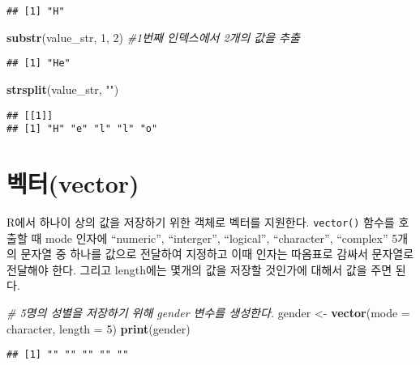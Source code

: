 \documentclass[
]{article}
\newenvironment{Shaded}{\begin{snugshade}}{\end{snugshade}}
\newcommand{\AttributeTok}[1]{\textcolor[rgb]{0.13,0.29,0.53}{#1}}
\newcommand{\CommentTok}[1]{\textcolor[rgb]{0.56,0.35,0.01}{\textit{#1}}}
\newcommand{\DecValTok}[1]{\textcolor[rgb]{0.00,0.00,0.81}{#1}}
\newcommand{\FunctionTok}[1]{\textcolor[rgb]{0.13,0.29,0.53}{\textbf{#1}}}
\newcommand{\NormalTok}[1]{#1}
\newcommand{\OtherTok}[1]{\textcolor[rgb]{0.56,0.35,0.01}{#1}}
\newcommand{\StringTok}[1]{\textcolor[rgb]{0.31,0.60,0.02}{#1}}
\begin{document}
\begin{verbatim}
## [1] "H"
\end{verbatim}

\begin{Shaded}
\begin{Highlighting}[]
\FunctionTok{substr}\NormalTok{(value\_str, }\DecValTok{1}\NormalTok{, }\DecValTok{2}\NormalTok{) }\CommentTok{\#1번째 인덱스에서 2개의 값을 추출}
\end{Highlighting}
\end{Shaded}

\begin{verbatim}
## [1] "He"
\end{verbatim}

\begin{Shaded}
\begin{Highlighting}[]
\FunctionTok{strsplit}\NormalTok{(value\_str, }\StringTok{""}\NormalTok{)}
\end{Highlighting}
\end{Shaded}

\begin{verbatim}
## [[1]]
## [1] "H" "e" "l" "l" "o"
\end{verbatim}

\hypertarget{uxbca1uxd130vector}{%
\section{벡터(vector)}\label{uxbca1uxd130vector}}

R에서 하나이 상의 값을 저장하기 위한 객체로 벡터를 지원한다.
\texttt{vector()} 함수를 호출할 때 mode 인자에 ``numeric'',
``interger'', ``logical'', ``character'', ``complex'' 5개의 문자열 중
하나를 값으로 전달하여 지정하고 이때 인자는 따옴표로 감싸서 문자열로
전달해야 한다. 그리고 length에는 몇개의 값을 저장할 것인가에 대해서 값을
주면 된다.

\begin{Shaded}
\begin{Highlighting}[]
\CommentTok{\# 5명의 성별을 저장하기 위해 gender 변수를 생성한다. }
\NormalTok{gender }\OtherTok{\textless{}{-}} \FunctionTok{vector}\NormalTok{(}\AttributeTok{mode =} \StringTok{\textquotesingle{}character\textquotesingle{}}\NormalTok{, }\AttributeTok{length =} \DecValTok{5}\NormalTok{)}
\FunctionTok{print}\NormalTok{(gender)}
\end{Highlighting}
\end{Shaded}

\begin{verbatim}
## [1] "" "" "" "" ""
\end{verbatim}
\end{document}

